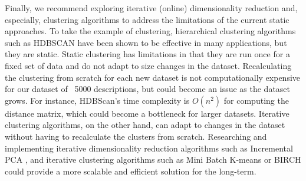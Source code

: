 Finally, we recommend exploring iterative (online) dimensionality reduction and, especially, clustering algorithms to address the limitations of the current static approaches. To take the example of clustering, hierarchical clustering algorithms such as HDBSCAN have been shown to be effective in many applications, but they are static. Static clustering has limitations in that they are run once for a fixed set of data and do not adapt to size changes in the dataset. Recalculating the clustering from scratch for each new dataset is not computationally expensive for our dataset of ~5000 descriptions, but could become an issue as the dataset grows. For instance, HDBScan's time complexity is $O(n^2)$ for computing the distance matrix, which could become a bottleneck for larger datasets. Iterative clustering algorithms, on the other hand, can adapt to changes in the dataset without having to recalculate the clusters from scratch. Researching and implementing iterative dimensionality reduction algorithms such as Incremental PCA \cite{balsubramani_fast_2013,artac_incremental_2002,dagher_incremental_2010}, and iterative clustering algorithms \cite{montiel_online_2022} such as Mini Batch K-means \cite{bejar_alonso_k-means_2013,hicks_mbkmeans_2021} or BIRCH \cite{zhang_birch_1996} could provide a more scalable and efficient solution for the long-term.